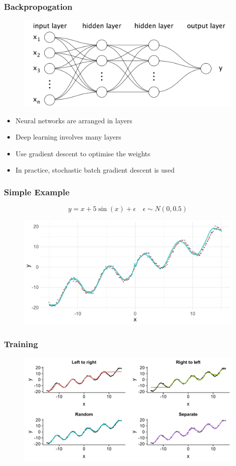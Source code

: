 \documentclass[aspectratio=169]{beamer}
\begin{document}
\begin{frame}
	\frametitle{Backpropogation}
	\begin{figure}
		\centering
		\includegraphics[width=0.7\linewidth]{nn-structure.pdf}
	\end{figure}
	\vspace*{-0.25cm}
	\begin{itemize}
		\item Neural networks are arranged in layers
		\item Deep learning involves many layers
		\item Use gradient descent to optimise the weights
		\item In practice, stochastic batch gradient descent is used
	\end{itemize}
\end{frame}

\begin{frame}
	\frametitle{Simple Example}
	\[ y = x + 5 \sin(x) + \epsilon \quad \epsilon \sim N(0, 0.5) \]
	\begin{figure}
		\includegraphics[width=0.8\linewidth]{ann-trained.pdf}
	\end{figure}
\end{frame}

\begin{frame}
	\frametitle{Training}
	\begin{figure}
		\includegraphics[width=0.9\linewidth]{compare-nn-order.pdf}
	\end{figure}
\end{frame}
\end{document}

